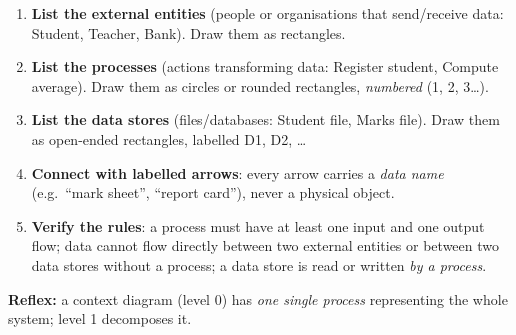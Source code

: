 \documentclass[11pt]{article}
\begin{document}
\begin{methode}
\begin{enumerate}
\item \textbf{List the external entities} (people or organisations that send/receive data: Student, Teacher, Bank). Draw them as rectangles.
\item \textbf{List the processes} (actions transforming data: Register student, Compute average). Draw them as circles or rounded rectangles, \emph{numbered} (1, 2, 3\dots).
\item \textbf{List the data stores} (files/databases: Student file, Marks file). Draw them as open-ended rectangles, labelled D1, D2, \dots
\item \textbf{Connect with labelled arrows}: every arrow carries a \emph{data name} (e.g.\ ``mark sheet'', ``report card''), never a physical object.
\item \textbf{Verify the rules}: a process must have at least one input and one output flow; data cannot flow directly between two external entities or between two data stores without a process; a data store is read or written \emph{by a process}.
\end{enumerate}
\textbf{Reflex:} a context diagram (level 0) has \emph{one single process} representing the whole system; level 1 decomposes it.
\end{methode}
\end{document}
